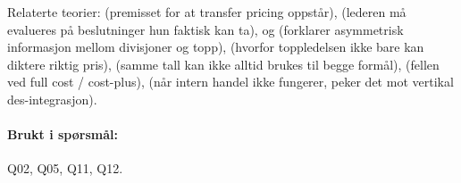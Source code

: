 Relaterte teorier:  (premisset for at transfer pricing oppstår),  (lederen må evalueres på beslutninger hun faktisk kan ta),  og  (forklarer asymmetrisk informasjon mellom divisjoner og topp),  (hvorfor toppledelsen ikke bare kan diktere riktig pris),  (samme tall kan ikke alltid brukes til begge formål),  (fellen ved full cost / cost-plus),  (når intern handel ikke fungerer, peker det mot vertikal des-integrasjon).

\paragraph{Brukt i spørsmål:} Q02, Q05, Q11, Q12.
